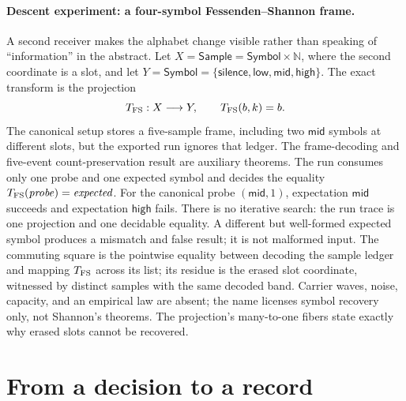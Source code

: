 \paragraph{Descent experiment: a four-symbol Fessenden--Shannon frame.}
A second receiver makes the alphabet change visible rather than speaking of ``information'' in the abstract.
Let \(X=\mathsf{Sample}=\mathsf{Symbol}\times\mathbb N\), where the second coordinate is a slot, and let \(Y=\mathsf{Symbol}=\{\mathsf{silence},\mathsf{low},\mathsf{mid},\mathsf{high}\}\).
The exact transform is the projection
\[
 T_{\rm FS}:X\longrightarrow Y,
 \qquad T_{\rm FS}(b,k)=b.
\]
The canonical setup stores a five-sample frame, including two \(\mathsf{mid}\) symbols at different slots, but the exported run ignores that ledger.
The frame-decoding and five-event count-preservation result are auxiliary theorems.
The run consumes only one probe and one expected symbol and decides the equality \(T_{\rm FS}(\mathit{probe})=\mathit{expected}\).
For the canonical probe \((\mathsf{mid},1)\), expectation \(\mathsf{mid}\) succeeds and expectation \(\mathsf{high}\) fails.
There is no iterative search: the run trace is one projection and one decidable equality.
A different but well-formed expected symbol produces a mismatch and false result; it is not malformed input.
The commuting square is the pointwise equality between decoding the sample ledger and mapping \(T_{\rm FS}\) across its list; its residue is the erased slot coordinate, witnessed by distinct samples with the same decoded band.
Carrier waves, noise, capacity, and an empirical law are absent; the name licenses symbol recovery only, not
Shannon's theorems.  The projection's many-to-one fibers state exactly why erased slots cannot be recovered.

\section{From a decision to a record}

